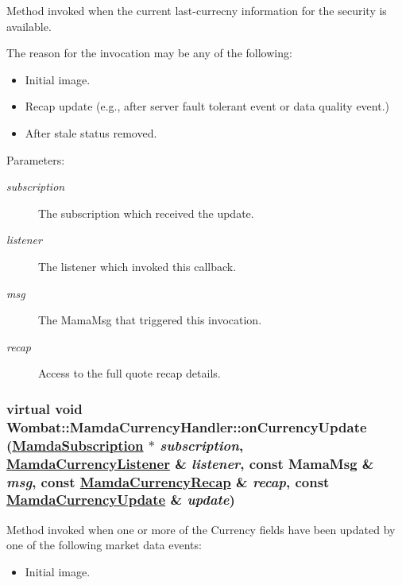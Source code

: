 Method invoked when the current last-currecny information for the security is available. 

The reason for the invocation may be any of the following:\begin{itemize}
\item Initial image.\item Recap update (e.g., after server fault tolerant event or data quality event.)\item After stale status removed.\end{itemize}


\begin{Desc}
\item[Parameters:]
\begin{description}
\item[{\em subscription}]The subscription which received the update. \item[{\em listener}]The listener which invoked this callback. \item[{\em msg}]The Mama\-Msg that triggered this invocation. \item[{\em recap}]Access to the full quote recap details. \end{description}
\end{Desc}
\hypertarget{classWombat_1_1MamdaCurrencyHandler_637c28d3d42ff832c798fd0615934200}{
\subsubsection[onCurrencyUpdate]{\setlength{\rightskip}{0pt plus 5cm}virtual void Wombat::Mamda\-Currency\-Handler::on\-Currency\-Update (\hyperlink{classWombat_1_1MamdaSubscription}{Mamda\-Subscription} $\ast$ {\em subscription}, \hyperlink{classWombat_1_1MamdaCurrencyListener}{Mamda\-Currency\-Listener} \& {\em listener}, const Mama\-Msg \& {\em msg}, const \hyperlink{classWombat_1_1MamdaCurrencyRecap}{Mamda\-Currency\-Recap} \& {\em recap}, const \hyperlink{classWombat_1_1MamdaCurrencyUpdate}{Mamda\-Currency\-Update} \& {\em update})}}
\label{classWombat_1_1MamdaCurrencyHandler_637c28d3d42ff832c798fd0615934200}


Method invoked when one or more of the Currency fields have been updated by one of the following market data events:\begin{itemize}
\item Initial image. \end{itemize}


